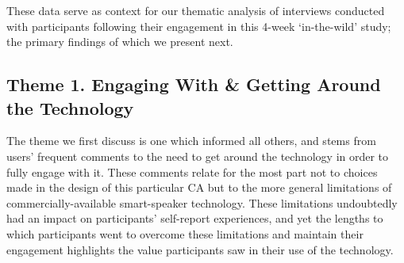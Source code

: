         These data serve as context for our thematic analysis of interviews conducted with participants following their engagement in this 4-week `in-the-wild' study; the primary findings of which we present next.
   
    \subsection{Theme 1. Engaging With \& Getting Around the Technology} %

        The theme we first discuss is one which informed all others, and stems from users' frequent comments to the need to get around the technology in order to fully engage with it. These comments relate for the most part not to choices made in the design of this particular \ac{CA} but to the more general limitations of commercially-available smart-speaker technology. These limitations undoubtedly had an impact on participants' self-report experiences, and yet the lengths to which participants went to overcome these limitations and maintain their engagement highlights the value participants saw in their use of the technology.
            

            
            

